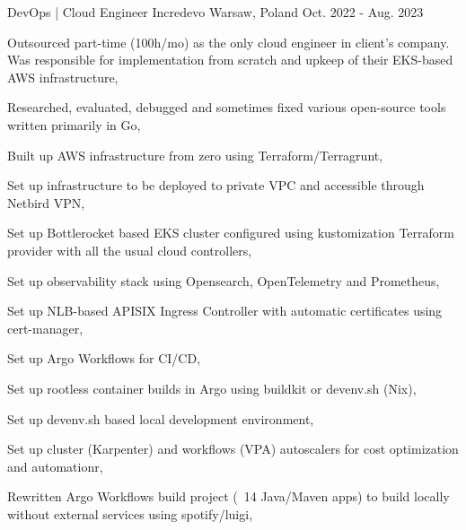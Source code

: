 

\begin{cventries}

  \cventry
  {DevOps | Cloud Engineer} %
  {Incredevo} %
  {Warsaw, Poland} %
  {Oct. 2022 - Aug. 2023} %
  {
    \begin{cvitems} %
      \item {Outsourced part-time (100h/mo) as the only cloud engineer in client's company. Was responsible for implementation from scratch and upkeep of their EKS-based AWS infrastructure,}
      \item {Researched, evaluated, debugged and sometimes fixed various open-source tools written primarily in Go,}
      \item {Built up AWS infrastructure from zero using Terraform/Terragrunt,}
      \item {Set up infrastructure to be deployed to private VPC and accessible through Netbird VPN,}
      \item {Set up Bottlerocket based EKS cluster configured using kustomization Terraform provider with all the usual cloud controllers,}
      \item {Set up observability stack using Opensearch, OpenTelemetry and Prometheus,}
      \item {Set up NLB-based APISIX Ingress Controller with automatic certificates using cert-manager,}
      \item {Set up Argo Workflows for CI/CD,}
      \item {Set up rootless container builds in Argo using buildkit or devenv.sh (Nix),}
      \item {Set up devenv.sh based local development environment,}
      \item {Set up cluster (Karpenter) and workflows (VPA) autoscalers for cost optimization and automationr,}
      \item {Rewritten Argo Workflows build project (~14 Java/Maven apps) to build locally without external services using spotify/luigi,}
    \end{cvitems}
  }


\end{cventries}
